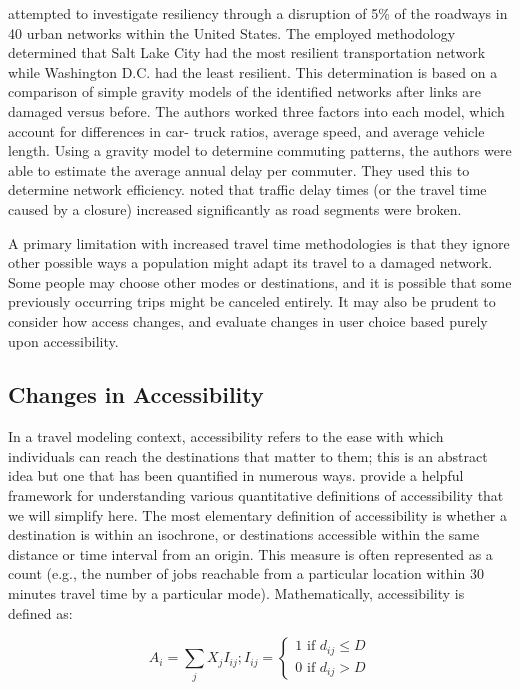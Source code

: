 \citet{ganin2017} attempted to investigate resiliency through a disruption
of 5\% of the roadways
in 40 urban networks within the United States. The employed methodology
determined that Salt Lake
City had the most resilient transportation network while Washington D.C.
had the least resilient.
This determination is based on a comparison of simple gravity models of the identified networks after links are
damaged versus before.
The authors worked three factors into each model, which account for
differences in car-
truck ratios, average speed, and average vehicle length. Using a gravity
model to determine commuting patterns, the authors were
able to estimate the average
annual delay per commuter. They used this to determine network efficiency.
\citeauthor{ganin2017} noted that
traffic delay times (or the travel time caused by a closure) increased
significantly as road segments were broken.

A primary limitation with increased travel time methodologies is that they
ignore other possible ways a population might adapt its travel to a
damaged
network. Some people may choose other modes or destinations, and it is
possible
that some previously occurring trips might be canceled entirely. It may also be
prudent to consider how access changes, and evaluate changes in user choice
based purely upon accessibility.

\subsection{Changes in Accessibility}
\label{sec:cacc}
In a travel modeling context, {accessibility} refers to the ease
with which
individuals can reach the destinations that matter to them; this is an
abstract
idea but one that has been quantified in numerous ways. \citet{dong2006}
provide a
helpful framework for understanding various quantitative definitions of
accessibility that we will simplify here. The most elementary definition of
accessibility is whether a destination is within an isochrone, or
destinations accessible within the same distance or time interval from an origin.
This measure is often represented as a count (e.g., the number
of jobs
reachable from a particular location within 30 minutes travel time by a
particular mode). Mathematically, accessibility is defined as:

\begin{equation}
A_i = \sum_{j} X_j I_{ij}; I_{ij} = \begin{cases}  1 \text{ if } d_{ij}
\leq D\\
0 \text{ if } d_{ij} > D \end{cases}
	\label{eqn:isochrone}
\end{equation}

